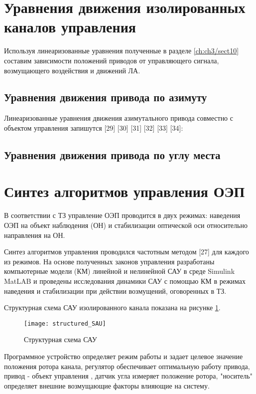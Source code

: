\section{Уравнения движения изолированных каналов управления} \label{ch:ch4/sect3}

Используя линеаризованные уравнения полученные в разделе \ref{ch:ch3/sect10} составим зависимости положений приводов от управляющего сигнала, возмущающего воздействия и движений ЛА. 

\subsection{Уравнения движения привода по азимуту} \label{subsec:ch4/sect3/sub1}

Линеаризованные уравнения движения азимутального привода совместно с объектом управления запишутся [29] [30] [31] [32] [33] [34]:

\subsection{Уравнения движения привода по углу места} \label{subsec:ch4/sect3/sub2}

\section{Синтез алгоритмов управления ОЭП} \label{ch:ch4/sect4-}

В соответствии с ТЗ управление ОЭП проводится в двух режимах:
наведения ОЭП на объект наблюдения (ОН) и стабилизации оптической оси относительно направления на ОН. 

Синтез алгоритмов управления проводился частотным методом [27] для каждого из режимов. На основе полученных законов управления разработаны компьютерные модели (КМ) линейной и нелинейной САУ в среде Simulink MatLAB и проведены исследования динамики САУ с помощью КМ в режимах наведения и стабилизации при действии возмущений, оговоренных в ТЗ.

Структурная схема САУ изолированного канала показана на рисунке \ref{fig:structured_SAU}.

\begin{figure}[ht]
	\centering
	\texttt{[image: structured\_SAU]}
	\caption{Структурная схема САУ}
	\label{fig:structured_SAU}
\end{figure}

Программное устройство определяет режим работы и задает целевое значение положения ротора канала, регулятор обеспечивает оптимальную работу привода, привод - объект управления , 
датчик угла измеряет положение ротора, "носитель" определяет внешние возмущающие факторы влияющие на систему.


